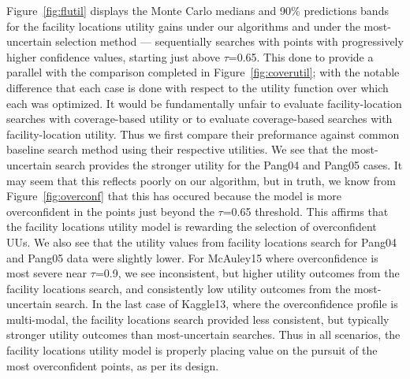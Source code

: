 \documentclass[letterpaper]{article} %
\begin{document}
Figure~\ref{fig:flutil} displays the Monte Carlo medians and 90\% predictions bands for the facility locations utility gains under our algorithms and under the most-uncertain selection method --- sequentially searches with points with progressively higher confidence values, starting just above $\tau$=0.65. This done to provide a parallel with the comparison completed in Figure~\ref{fig:coverutil}; with the notable difference that each case is done with respect to the utility function over which each was optimized. It would be fundamentally unfair to evaluate facility-location searches with coverage-based utility or to evaluate coverage-based searches with facility-location utility. Thus we first compare their preformance against common baseline search method using their respective utilities. We see that the most-uncertain search provides the stronger utility for the Pang04 and Pang05 cases. It may seem that this reflects poorly on our algorithm, but in truth, we know from Figure~\ref{fig:overconf} that this has occured because the model is more overconfident in the points just beyond the $\tau$=0.65 threshold. This affirms that the facility locations utility model is rewarding the selection of overconfident UUs. We also see that the utility values from facility locations search for Pang04 and Pang05 data were slightly lower. For McAuley15 where overconfidence is most severe near $\tau$=0.9, we see inconsistent, but higher utility outcomes from the facility locations search, and consistently low utility outcomes from the most-uncertain search. In the last case of Kaggle13, where the overconfidence profile is multi-modal, the facility locations search provided less consistent, but typically stronger utility outcomes than most-uncertain searches. Thus in all scenarios, the facility locations utility model is properly placing value on the pursuit of the most overconfident points, as per its design.

\end{document}
